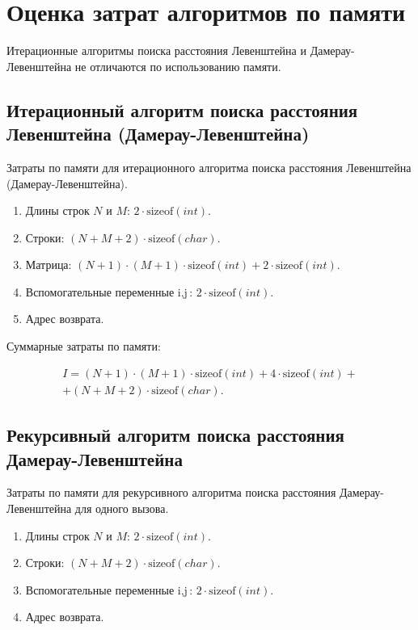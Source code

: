\section{Оценка затрат алгоритмов по памяти}

Итерационные алгоритмы поиска расстояния Левенштейна и Дамерау-Левенштейна не отличаются по использованию памяти.

\subsection{Итерационный алгоритм поиска расстояния Левенштейна (Дамерау-Левенштейна)}

Затраты по памяти для итерационного алгоритма поиска расстояния Левенштейна (Дамерау-Левенштейна).

\begin{enumerate}
\item Длины строк $N$ и $M$: $2 \cdot \mbox{sizeof}(int)$.
\item Строки: $(N + M + 2) \cdot \mbox{sizeof}(char)$.
\item Матрица: $(N + 1) \cdot (M + 1) \cdot \mbox{sizeof}(int) + 2 \cdot \mbox{sizeof}(int)$.
\item Вспомогательные переменные $\mbox{i}, \mbox{j}$: $2 \cdot \mbox{sizeof}(int)$.
\item Адрес возврата.
\end{enumerate}

Суммарные затраты по памяти: 

\begin{equation}
\begin{gathered}
I = (N + 1) \cdot (M + 1) \cdot \mbox{sizeof}(int) + 4 \cdot \mbox{sizeof}(int) + \\ + (N + M + 2) \cdot \mbox{sizeof}(char).
\end{gathered}
\end{equation}

\subsection{Рекурсивный алгоритм поиска расстояния Дамерау-Левенштейна}

Затраты по памяти для рекурсивного алгоритма поиска расстояния
Дамерау-Левенштейна для одного вызова.

\begin{enumerate}
\item Длины строк $N$ и $M$: $2 \cdot \mbox{sizeof}(int)$.
\item Строки: $(N + M + 2) \cdot \mbox{sizeof}(char)$.
\item Вспомогательные переменные $\mbox{i}, \mbox{j}$: $2 \cdot \mbox{sizeof}(int)$.
\item Адрес возврата.
\end{enumerate}

